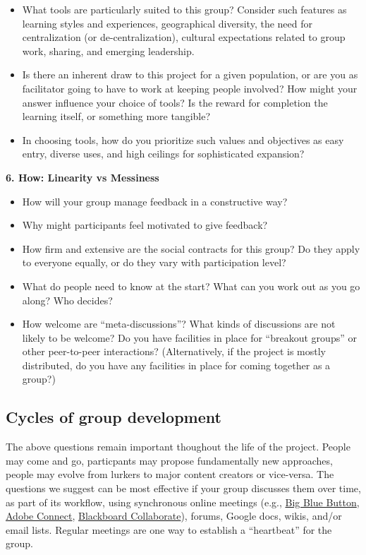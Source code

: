 \begin{itemize}
\item
  What tools are particularly suited to this group? Consider such
  features as learning styles and experiences, geographical diversity,
  the need for centralization (or de-centralization), cultural
  expectations related to group work, sharing, and emerging leadership.
\item
  Is there an inherent draw to this project for a given population, or
  are you as facilitator going to have to work at keeping people
  involved? How might your answer influence your choice of tools? Is the
  reward for completion the learning itself, or something more tangible?
\item
  In choosing tools, how do you prioritize such values and objectives as
  easy entry, diverse uses, and high ceilings for sophisticated
  expansion?
\end{itemize}
\textbf{6. How: Linearity vs Messiness}

\begin{itemize}
\item
  How will your group manage feedback in a constructive way?
\item
  Why might participants feel motivated to give feedback?
\item
  How firm and extensive are the social contracts for this group? Do
  they apply to everyone equally, or do they vary with participation
  level?
\item
  What do people need to know at the start? What can you work out as you
  go along? Who decides?
\item
  How welcome are ``meta-discussions''? What kinds of discussions are
  not likely to be welcome? Do you have facilities in place for
  ``breakout groups'' or other peer-to-peer interactions?
  (Alternatively, if the project is mostly distributed, do you have any
  facilities in place for coming together as a group?)
\end{itemize}
\subsection{Cycles of group development}

The above questions remain important thoughout the life of the project.
People may come and go, particpants may propose fundamentally new
approaches, people may evolve from lurkers to major content creators or
vice-versa. The questions we suggest can be most effective if your group
discusses them over time, as part of its workflow, using synchronous
online meetings (e.g., \href{http://www.bigbluebutton.org/}{Big Blue
Button},
\href{http://success.adobe.com/en/na/sem/products/connect/1109\_6011\_connect\_webinars.html?sdid=IEASO\&skwcid=TC\textbar{}22191\textbar{}adobe\%20connect\textbar{}\textbar{}S\textbar{}e\textbar{}5894715262}{Adobe
Connect},
\href{http://www.blackboard.com/platforms/collaborate/overview.aspx}{Blackboard
Collaborate}), forums, Google docs, wikis, and/or email lists. Regular
meetings are one way to establish a ``heartbeat'' for the group.

